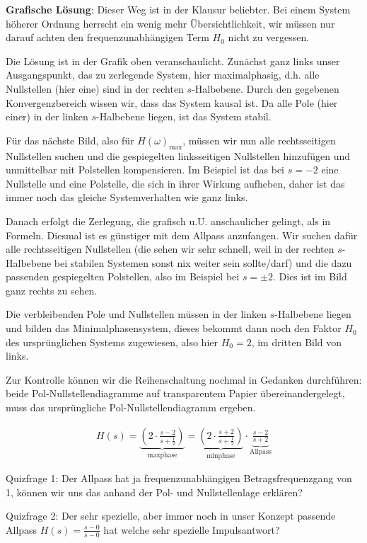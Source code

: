 \begin{ExCalc}
\textbf{Grafische Lösung}: Dieser Weg ist in der Klausur beliebter.
Bei einem System höherer Ordnung herrscht ein wenig mehr Übersichtlichkeit,
wir müssen nur darauf achten den frequenzunabhängigen Term $H_0$ nicht zu vergessen.

Die Lösung ist in der Grafik oben veranschaulicht. Zunächst ganz links unser
Ausgangspunkt, das zu zerlegende System, hier maximalphasig, d.h.
alle Nullstellen (hier eine) sind in der rechten $s$-Halbebene.
Durch den gegebenen Konvergenzbereich wissen wir, dass das System kausal ist.
Da alle Pole (hier einer) in der linken $s$-Halbebene liegen, ist das System
stabil.

Für das nächste Bild, also für $H(\omega)_\mathrm{max}$,
müssen wir nun alle rechtsseitigen Nullstellen
suchen und die gespiegelten linksseitigen Nullstellen hinzufügen und unmittelbar
mit Polstellen kompensieren.
Im Beispiel ist das bei $s=-2$ eine Nullstelle und eine Polstelle,
die sich in ihrer Wirkung aufheben, daher ist das immer noch das gleiche
Systemverhalten wie ganz links.

Danach erfolgt die Zerlegung, die grafisch u.U. anschaulicher gelingt, als in Formeln.
Diesmal ist es günstiger mit dem Allpass anzufangen.
Wir suchen dafür alle rechtsseitigen Nullstellen (die sehen wir sehr schnell, weil
in der rechten $s$-Halbebene bei stabilen Systemen sonst nix weiter sein sollte/darf)
und die dazu passenden gespiegelten Polstellen, also im Beispiel bei $s=\pm 2$.
Dies ist im Bild ganz rechts zu sehen.

Die verbleibenden Pole und Nullstellen müssen in der linken $s$-Halbebene liegen und
bilden das Minimalphasensystem, dieses bekommt dann noch den Faktor $H_0$ des
ursprünglichen Systems zugewiesen, also hier $H_0=2$, im dritten Bild von links.

Zur Kontrolle können wir die Reihenschaltung nochmal in Gedanken durchführen:
beide Pol-Nullstellendiagramme auf transparentem Papier übereinandergelegt,
muss das ursprüngliche Pol-Nullstellendiagramm ergeben.

\end{ExCalc}


\begin{Loesung}
\begin{align}
H(s) =
\underbrace{\left(2\cdot\frac{s-2}{s+\frac{1}{2}}\right)}_{\mathrm{max phase}} =
\underbrace{\left(2\cdot\frac{s+2}{s+\frac{1}{2}}\right)}_{\mathrm{min phase}}
\cdot \underbrace{\frac{s-2}{s+2}}_{\mathrm{Allpass}}
\end{align}

Quizfrage 1: Der Allpass hat ja frequenzunabhängigen Betragsfrequenzgang von 1,
können wir uns das anhand der Pol- und Nullstellenlage erklären?

Quizfrage 2: Der sehr spezielle, aber immer noch in unser Konzept passende
Allpass $H(s) = \frac{s-0}{s-0}$ hat welche sehr spezielle Impulsantwort?
\end{Loesung}






